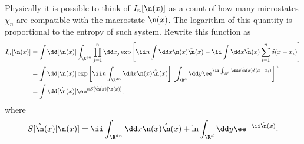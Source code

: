 Physically it is possible to think of  $I_n[\n(x)]$ as a count of how many microstates $\chi_n$ are compatible with the macrostate $\n(x)$. The logarithm of this quantity is proportional to the entropy of such system. Rewrite this function as
\begin{align}
	I_n[\n(x)] & = \int \dd [\n(x)] \int_{\R^{dn}} \prod_{j=1}^{n} \dd x_j \exp{ \left[\ii n \int \dd x \n(x) \hat{\n}(x) - \ii \int \dd x \hat{\n}(x) \sum_{i=1}^{n} \delta(x - x_i) \right]} \\
	& =  \int \dd [\n(x)]  \exp{\left[ \ii n \int_{\R^{dn}} \dd x \n(x) \hat{\n}(x) \right]} \left[ \int_{\R^d} \dd y \ee ^{\ii \int_{\R^d} \dd x \hat{\n}(x) \delta(x- x_i) } \right]^n \\
	& = \int \dd [\hat{\n}(x)] \ee^{n S[\hat{\n}(x) | \n(x)]},
	\label{Equation: logarithmic energyy - entropy}
\end{align}
where
\begin{equation}
	S[\hat{\n}(x) | \n(x)] = \ii \int_{\R^{dn}} \dd x \n(x) \hat{\n}(x) + \ln \int_{\R^d} \dd y \ee^{-\ii \hat{\n}(x)}.
\end{equation}

